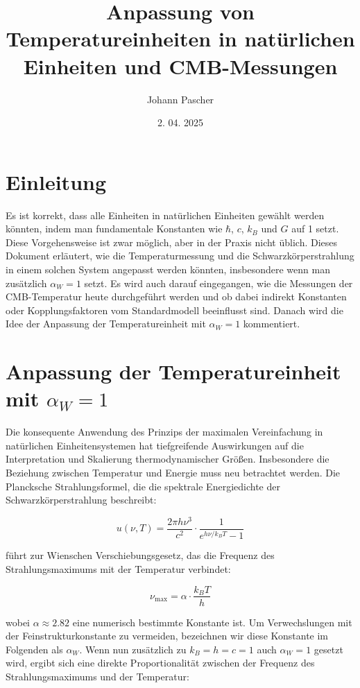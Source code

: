 \documentclass[12pt,a4paper]{article}
\title{Anpassung von Temperatureinheiten in natürlichen Einheiten und CMB-Messungen}
\author{Johann Pascher}
\date{2. 04. 2025}
\begin{document}
	
	\maketitle
	
	\section*{Einleitung}
	
	Es ist korrekt, dass alle Einheiten in natürlichen Einheiten gewählt werden könnten, indem man fundamentale Konstanten wie $\hbar$, $c$, $k_B$ und $G$ auf 1 setzt. Diese Vorgehensweise ist zwar möglich, aber in der Praxis nicht üblich. Dieses Dokument erläutert, wie die Temperaturmessung und die Schwarzkörperstrahlung in einem solchen System angepasst werden könnten, insbesondere wenn man zusätzlich $\alpha_W = 1$ setzt. Es wird auch darauf eingegangen, wie die Messungen der CMB-Temperatur heute durchgeführt werden und ob dabei indirekt Konstanten oder Kopplungsfaktoren vom Standardmodell beeinflusst sind. Danach wird die Idee der Anpassung der Temperatureinheit mit $\alpha_W = 1$ kommentiert.
	
	\section{Anpassung der Temperatureinheit mit $\alpha_W = 1$}
	
	Die konsequente Anwendung des Prinzips der maximalen Vereinfachung in natürlichen Einheitensystemen hat tiefgreifende Auswirkungen auf die Interpretation und Skalierung thermodynamischer Größen. Insbesondere die Beziehung zwischen Temperatur und Energie muss neu betrachtet werden. Die Plancksche Strahlungsformel, die die spektrale Energiedichte der Schwarzkörperstrahlung beschreibt:
	
	\begin{equation}
		u(\nu, T) = \frac{2\pi h \nu^3}{c^2} \cdot \frac{1}{e^{h \nu / k_B T} - 1}
	\end{equation}
	
	führt zur Wienschen Verschiebungsgesetz, das die Frequenz des Strahlungsmaximums mit der Temperatur verbindet:
	
	\begin{equation}
		\nu_{\text{max}} = \alpha \cdot \frac{k_B T}{h}
	\end{equation}
	
	wobei $\alpha \approx 2.82$ eine numerisch bestimmte Konstante ist. Um Verwechslungen mit der Feinstrukturkonstante zu vermeiden, bezeichnen wir diese Konstante im Folgenden als $\alpha_W$. Wenn nun zusätzlich zu $k_B = h = c = 1$ auch $\alpha_W = 1$ gesetzt wird, ergibt sich eine direkte Proportionalität zwischen der Frequenz des Strahlungsmaximums und der Temperatur:
	
\end{document}
